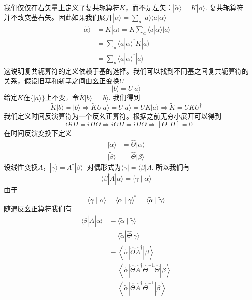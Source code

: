 \documentclass{article}
\numberwithin{equation}{subsection}
\begin{document}
我们仅仅在右矢量上定义了复共轭算符$K$，而不是左矢：$|\tilde{\alpha}\rangle=K|\alpha\rangle$. 复共轭算符并不改变基右矢。因此如果我们展开$|\alpha\rangle=\sum_{a}|a\rangle\langle a|\alpha\rangle$
\begin{equation}
    \begin{split}
        |\tilde{\alpha}\rangle&=K|\alpha\rangle=K\sum_{a}\langle a|\alpha\rangle|a\rangle\\
        &=\sum_a\langle a|\alpha\rangle^* K|a\rangle\\
        &=\sum_a\langle a|\alpha\rangle^*|a\rangle
    \end{split}
\end{equation}
这说明复共轭算符的定义依赖于基的选择。我们可以找到不同基之间复共轭算符的关系，假设旧基和新基之间由幺正变换$U$
\begin{equation}
    |b\rangle=U|a\rangle
\end{equation}
给定$K$在$\{|a\rangle\}$上不变，令$\tilde{K}|b\rangle=|b\rangle$. 我们得到
\begin{equation}
    \tilde{K}|b\rangle=|b\rangle\Rightarrow\tilde{K}U|a\rangle=U|a\rangle=UK|a\rangle\Rightarrow \tilde{K}=UKU^\dagger
\end{equation}
我们定义时间反演算符为一个反幺正算符。根据之前无穷小展开可以得到
\begin{equation}
    -\Theta iH=iH\Theta\Rightarrow i\Theta H=iH\Theta\Rightarrow[\Theta,H]=0
\end{equation}
在时间反演变换下定义
\begin{equation}
    \begin{aligned}
        |\tilde{\alpha}\rangle &=\hat{\Theta}|\alpha\rangle \\
        |\tilde{\beta}\rangle &=\hat{\Theta}|\beta\rangle
        \end{aligned}
\end{equation}
设线性变换$A$，$|\gamma\rangle=A^\dagger|\beta\rangle$, 对偶形式为$\langle\gamma|=\langle\beta|A$. 所以我们有
\begin{equation}
    \langle\beta|\hat{A}| \alpha\rangle=\langle\gamma \mid \alpha\rangle
\end{equation}
由于
\begin{equation}
    \langle\gamma \mid \alpha\rangle=\langle\alpha \mid \gamma\rangle^{*}=\langle\tilde{\alpha} \mid \tilde{\gamma}\rangle
\end{equation}
随遇反幺正算符我们有
\begin{equation}
    \begin{aligned}
        \langle\beta|\hat{A}| \alpha\rangle &=\langle\tilde{\alpha} \mid \tilde{\gamma}\rangle \\
        &=\langle\tilde{\alpha}|\hat{\Theta}| \gamma\rangle \\
        &=\left\langle\tilde{\alpha}\left|\hat{\Theta} \hat{A}^{\dagger}\right| \beta\right\rangle \\
        &=\left\langle\tilde{\alpha}\left|\hat{\Theta} \hat{A}^{\dagger} \hat{\Theta}^{-1} \hat{\Theta}\right| \beta\right\rangle \\
        &=\left\langle\tilde{\alpha}\left|\hat{\Theta} \hat{A}^{\dagger} \hat{\Theta}^{-1}\right| \tilde{\beta}\right\rangle
        \end{aligned}
\end{equation}
\end{document}
